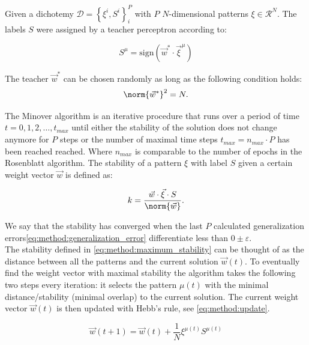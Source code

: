 Given a dichotemy $\mathcal{D} = \left\{\xi^i, S^i \right\}_{i}^{P}$ with $P$ $N$-dimensional patterns $\xi \in \mathcal{R}^N$. The labels $S$ were assigned by a teacher perceptron according to:

\begin{equation}\label{eq:method:teacher_label}
	S^\mu = \text{sign}(\vec{w}^* \cdot {\vec{\xi}}^{\mu})
\end{equation}

The teacher $\vec{w}^*$ can be chosen randomly as long as the following condition holds:
\begin{equation}\label{eq:method:teachervectorcondition}
	\norm{\vec{w}^*}^2 = N.
\end{equation}

The Minover algorithm is an iterative procedure that runs over a period of time $t = 0, 1, 2, \dotsc, t_{max}$ until either the stability of the solution does not change anymore for $P$ steps or the number of maximal time steps $t_{max} = n_{max} \cdot P$ has been reached reached. Where $n_{max}$ is comparable to the number of epochs in the Rosenblatt algorithm. The stability of a pattern $\xi$ with label $S$ given a certain weight vector $\vec{w}$ is defined as:

\begin{equation}\label{eq:method:maximum_stability}
	\mathnormal{k} = \frac{\vec{w} \cdot \vec{\xi} \cdot S}{\norm{\vec{w}}}.
\end{equation}

We say that the stability has converged when the last $P$ calculated generalization errors\eqref{eq:method:generalization_error} differentiate less than $0 \pm \varepsilon$.\\

The stability defined in \eqref{eq:method:maximum_stability} can be thought of as the distance between all the patterns and the current solution $\vec{w}(t)$. To eventually find the weight vector with maximal stability the algorithm takes the following two steps every iteration: it selects the pattern $\mu(t)$ with the minimal distance/stability (minimal overlap) to the current solution. The current weight vector $\vec{w}(t)$ is then updated with Hebb's rule, see \eqref{eq:method:update}.

\begin{equation}\label{eq:method:update}
	\vec{w}(t + 1) = \vec{w}(t) + \frac{1}{N} \xi^{\mu(t)} S^{\mu(t)} 
\end{equation}

